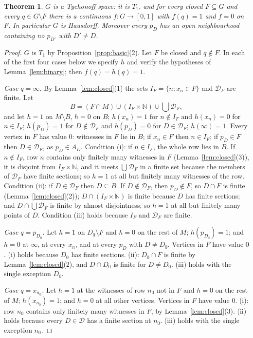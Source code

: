\documentclass[11pt]{amsart}
\newtheorem{theorem}{Theorem}[section]
\theoremstyle{definition}
\theoremstyle{remark}
\newcommand{\N}{\mathbb{N}}
\newcommand{\cD}{\mathcal{D}}
\numberwithin{equation}{section}
\begin{document}
\begin{theorem}\label{thm:tych}
$G$ is a Tychonoff space: it is $T_1$, and for every closed $F\subseteq G$ and every $q\in G\setminus F$ there is a continuous $f\colon G\to[0,1]$ with $f(q)=1$ and $f=0$ on $F$. In particular $G$ is Hausdorff. Moreover every $p_D$ has an open neighbourhood containing no $p_{D'}$ with $D'\ne D$.
\end{theorem}
\begin{proof}
$G$ is $T_1$ by Proposition~\ref{prop:basic}(2). Let $F$ be closed and $q\notin F$. In each of the first four cases below we specify $h$ and verify the hypotheses of Lemma~\ref{lem:binary}; then $f(q)=h(q)=1$.

\emph{Case $q=\infty$.} By Lemma~\ref{lem:closed}(1) the sets $I_F=\{n:x_n\in F\}$ and $\cD_F$ are finite. Let
\[B=(F\cap M)\cup(I_F\times\N)\cup\bigcup\cD_F,\]
and let $h=1$ on $M\setminus B$, $h=0$ on $B$; $h(x_n)=1$ for $n\notin I_F$ and $h(x_n)=0$ for $n\in I_F$; $h(p_D)=1$ for $D\notin\cD_F$ and $h(p_D)=0$ for $D\in\cD_F$; $h(\infty)=1$. Every vertex in $F$ has value $0$: witnesses in $F$ lie in $B$; if $x_n\in F$ then $n\in I_F$; if $p_D\in F$ then $D\in\cD_F$, as $p_D\in A_D$. Condition (i): if $n\in I_F$, the whole row lies in $B$. If $n\notin I_F$, row $n$ contains only finitely many witnesses in $F$ (Lemma~\ref{lem:closed}(3)), it is disjoint from $I_F\times\N$, and it meets $\bigcup\cD_F$ in a finite set because the members of $\cD_F$ have finite sections; so $h=1$ at all but finitely many witnesses of the row. Condition (ii): if $D\in\cD_F$ then $D\subseteq B$. If $D\notin\cD_F$, then $p_D\notin F$, so $D\cap F$ is finite (Lemma~\ref{lem:closed}(2)); $D\cap(I_F\times\N)$ is finite because $D$ has finite sections; and $D\cap\bigcup\cD_F$ is finite by almost disjointness; so $h=1$ at all but finitely many points of $D$. Condition (iii) holds because $I_F$ and $\cD_F$ are finite.

\emph{Case $q=p_{D_0}$.} Let $h=1$ on $D_0\setminus F$ and $h=0$ on the rest of $M$; $h(p_{D_0})=1$; and $h=0$ at $\infty$, at every $x_n$, and at every $p_D$ with $D\ne D_0$. Vertices in $F$ have value $0$. (i) holds because $D_0$ has finite sections. (ii): $D_0\cap F$ is finite by Lemma~\ref{lem:closed}(2), and $D\cap D_0$ is finite for $D\ne D_0$. (iii) holds with the single exception $D_0$.

\emph{Case $q=x_{n_0}$.} Let $h=1$ at the witnesses of row $n_0$ not in $F$ and $h=0$ on the rest of $M$; $h(x_{n_0})=1$; and $h=0$ at all other vertices. Vertices in $F$ have value $0$. (i): row $n_0$ contains only finitely many witnesses in $F$, by Lemma~\ref{lem:closed}(3). (ii) holds because every $D\in\cD$ has a finite section at $n_0$. (iii) holds with the single exception $n_0$.


\end{proof}
\end{document}
